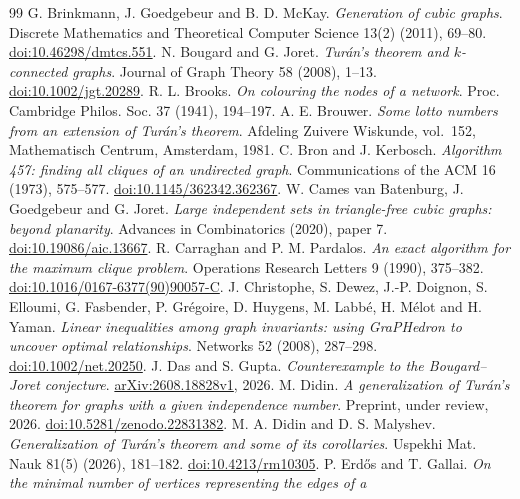 \documentclass[11pt]{article}
\theoremstyle{definition}
\theoremstyle{remark}
\begin{document}
\begin{thebibliography}{99}\small
{} G. Brinkmann, J. Goedgebeur and B. D. McKay. \emph{Generation of cubic graphs}. Discrete
Mathematics and Theoretical Computer Science 13(2) (2011), 69--80.
\href{https://doi.org/10.46298/dmtcs.551}{doi:10.46298/dmtcs.551}.
 N. Bougard and G. Joret. \emph{Tur\'an's theorem and $k$-connected graphs}. Journal of Graph Theory 58
(2008), 1--13. \href{https://doi.org/10.1002/jgt.20289}{doi:10.1002/jgt.20289}.
 R. L. Brooks. \emph{On colouring the nodes of a network}. Proc. Cambridge Philos. Soc. 37 (1941),
194--197.
 A. E. Brouwer. \emph{Some lotto numbers from an extension of Tur\'an's theorem}. Afdeling Zuivere
Wiskunde, vol.~152, Mathematisch Centrum, Amsterdam, 1981.
 C. Bron and J. Kerbosch. \emph{Algorithm 457: finding all cliques of an undirected graph}.
Communications of the ACM 16 (1973), 575--577. \href{https://doi.org/10.1145/362342.362367}{doi:10.1145/362342.362367}.
 W. Cames van Batenburg, J. Goedgebeur and G. Joret. \emph{Large independent sets in
triangle-free cubic graphs: beyond planarity}. Advances in Combinatorics (2020), paper 7.
\href{https://doi.org/10.19086/aic.13667}{doi:10.19086/aic.13667}.
 R. Carraghan and P. M. Pardalos. \emph{An exact algorithm for the maximum clique problem}.
Operations Research Letters 9 (1990), 375--382.
\href{https://doi.org/10.1016/0167-6377(90)90057-C}{doi:10.1016/0167-6377(90)90057-C}.
 J. Christophe, S. Dewez, J.-P. Doignon, S. Elloumi, G. Fasbender, P. Gr\'egoire, D. Huygens,
M. Labb\'e, H. M\'elot and H. Yaman. \emph{Linear inequalities among graph invariants: using GraPHedron to uncover
optimal relationships}. Networks 52 (2008), 287--298.
\href{https://doi.org/10.1002/net.20250}{doi:10.1002/net.20250}.
 J. Das and S. Gupta. \emph{Counterexample to the Bougard--Joret conjecture}.
\href{https://arxiv.org/abs/2608.18828}{arXiv:2608.18828v1}, 2026.
 M. Didin. \emph{A generalization of Tur\'an's theorem for graphs with a given independence number}.
Preprint, under review, 2026. \href{https://doi.org/10.5281/zenodo.22831382}{doi:10.5281/zenodo.22831382}.
 M. A. Didin and D. S. Malyshev. \emph{Generalization of Tur\'an's theorem and some of its
corollaries}. Uspekhi Mat. Nauk 81(5) (2026), 181--182. \href{https://doi.org/10.4213/rm10305}{doi:10.4213/rm10305}.
 P. Erd\H{o}s and T. Gallai. \emph{On the minimal number of vertices representing the edges of a
}
\end{thebibliography}
\end{document}
